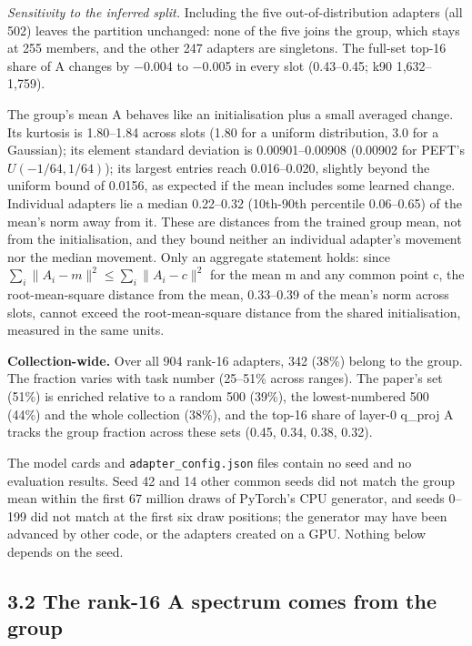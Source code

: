 \documentclass[
  11pt,
]{article}
\newcounter{none} %
\begin{document}
\emph{Sensitivity to the inferred split.} Including the five
out-of-distribution adapters (all 502) leaves the partition unchanged:
none of the five joins the group, which stays at 255 members, and the
other 247 adapters are singletons. The full-set top-16 share of A
changes by \ensuremath{-}0.004 to \ensuremath{-}0.005 in every slot (0.43--0.45; k90
1,632--1,759).

The group's mean A behaves like an initialisation plus a small averaged
change. Its kurtosis is 1.80--1.84 across slots (1.80 for a uniform
distribution, 3.0 for a Gaussian); its element standard deviation is
0.00901--0.00908 (0.00902 for PEFT's \(U(-1/64, 1/64)\)); its largest
entries reach 0.016--0.020, slightly beyond the uniform bound of 0.0156,
as expected if the mean includes some learned change. Individual
adapters lie a median 0.22--0.32 (10th-90th percentile 0.06--0.65) of
the mean's norm away from it. These are distances from the trained group
mean, not from the initialisation, and they bound neither an individual
adapter's movement nor the median movement. Only an aggregate statement
holds: since \(\sum_i \|A_i - m\|^2 \le \sum_i \|A_i - c\|^2\) for the
mean m and any common point c, the root-mean-square distance from the
mean, 0.33--0.39 of the mean's norm across slots, cannot exceed the
root-mean-square distance from the shared initialisation, measured in
the same units.

\textbf{Collection-wide.} Over all 904 rank-16 adapters, 342 (38\%)
belong to the group. The fraction varies with task number (25--51\%
across ranges). The paper's set (51\%) is enriched relative to a random
500 (39\%), the lowest-numbered 500 (44\%) and the whole collection
(38\%), and the top-16 share of layer-0 q\_proj A tracks the group
fraction across these sets (0.45, 0.34, 0.38, 0.32).

The model cards and \texttt{adapter\_\allowbreak{}config.json} files contain no seed
and no evaluation results. Seed 42 and 14 other common seeds did not
match the group mean within the first 67 million draws of PyTorch's CPU
generator, and seeds 0--199 did not match at the first six draw
positions; the generator may have been advanced by other code, or the
adapters created on a GPU. Nothing below depends on the seed.

\subsection{3.2 The rank-16 A spectrum comes from the
group}\label{the-rank-16-a-spectrum-comes-from-the-group}
\end{document}
